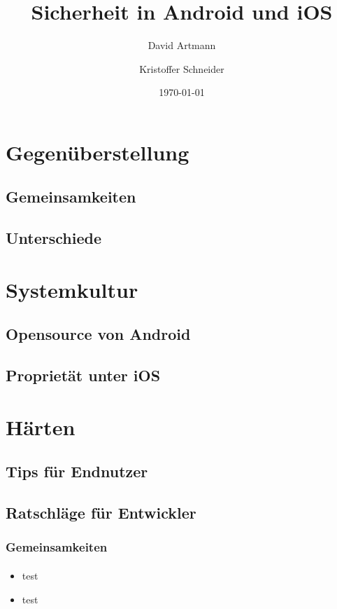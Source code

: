 \documentclass{beamer}
\title{Sicherheit in Android und iOS}
\author{David Artmann\inst{1} \and Kristoffer Schneider\inst{1}}
\institute[Universities of]
{
\inst{1}
Hochschule für angewandte Wissenschaften\\
Würzburg-Schweinfurt
}
\date{\today}
\begin{document}





\section{Gegenüberstellung}
	\subsection[Gemeinsamkeiten]{Gemeinsamkeiten}
	\subsection[Unterschiede]{Unterschiede}
\section{Systemkultur}
	\subsection{Opensource von Android}
	\subsection{Proprietät unter iOS}
	
\section{Härten}
	\subsection{Tips für Endnutzer}
	\subsection{Ratschläge für Entwickler}
\begin{frame}
\frametitle{Gemeinsamkeiten}
\framesubtitle{}

\begin{itemize}
  \item test
  \item test
\end{itemize}
\end{frame}
\end{document}
